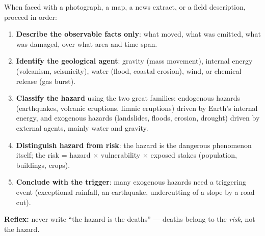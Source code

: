 \documentclass[11pt]{article}
\newcommand{\cle}[1]{{\popxbold\color{popdark}#1}}
\begin{document}
\begin{methode}
When faced with a photograph, a map, a news extract, or a field description, proceed in order:
\begin{enumerate}
\item \textbf{Describe the observable facts only}: what moved, what was emitted, what was damaged, over what area and time span.
\item \textbf{Identify the geological agent}: gravity (mass movement), internal energy (volcanism, seismicity), water (flood, coastal erosion), wind, or chemical release (gas burst).
\item \textbf{Classify the hazard} using the two great families: \cle{endogenous hazards} (earthquakes, volcanic eruptions, limnic eruptions) driven by Earth's internal energy, and \cle{exogenous hazards} (landslides, floods, erosion, drought) driven by external agents, mainly water and gravity.
\item \textbf{Distinguish hazard from risk}: the \cle{hazard} is the dangerous phenomenon itself; the \cle{risk} = hazard $\times$ vulnerability $\times$ exposed stakes (population, buildings, crops).
\item \textbf{Conclude with the trigger}: many exogenous hazards need a triggering event (exceptional rainfall, an earthquake, undercutting of a slope by a road cut).
\end{enumerate}
\textbf{Reflex:} never write ``the hazard is the deaths'' — deaths belong to the \emph{risk}, not the hazard.
\end{methode}
\end{document}
